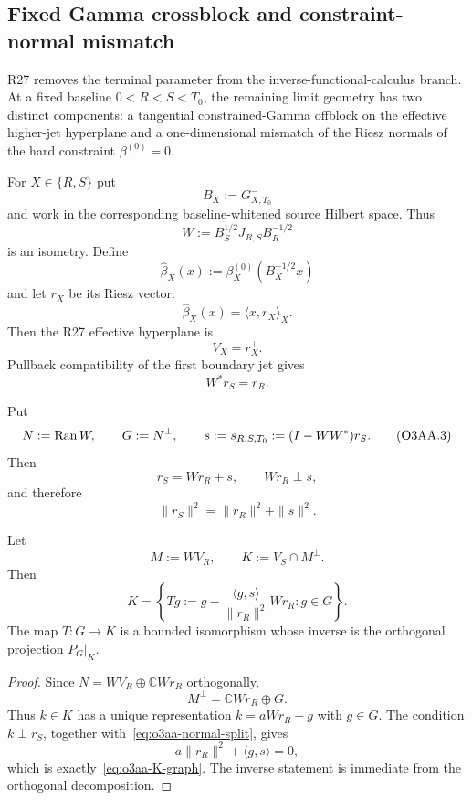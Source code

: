 
\subsection{Fixed Gamma crossblock and constraint-normal mismatch}
\label{subsec:o3aa-fixed-gamma-crossblock}

R27 removes the terminal parameter from the inverse-functional-calculus branch.  At a
fixed baseline $0<R<S<T_0$, the remaining limit geometry has two distinct components:
a tangential constrained-Gamma offblock on the effective higher-jet hyperplane and a
one-dimensional mismatch of the Riesz normals of the hard constraint
$\beta^{(0)}=0$.

For $X\in\{R,S\}$ put
\[
 B_X:=G_{X,T_0}^-
\]
and work in the corresponding baseline-whitened source Hilbert space.  Thus
\[
 W:=B_S^{1/2}J_{R,S}B_R^{-1/2}
\]
is an isometry.  Define
\[
 \widehat\beta_X(x):=\beta_X^{(0)}(B_X^{-1/2}x)
\]
and let $r_X$ be its Riesz vector:
\[
 \widehat\beta_X(x)=\langle x,r_X\rangle_X.
\]
Then the R27 effective hyperplane is
\[
 V_X=r_X^\perp.
\tag{O3AA.1}\label{eq:o3aa-VX}
\]
Pullback compatibility of the first boundary jet gives
\[
 \boxed{W^*r_S=r_R.}
\tag{O3AA.2}\label{eq:o3aa-normal-pullback}
\]

Put
\[
 N:=\operatorname{Ran} W,
 \qquad
 G:=N^\perp,
 \qquad
 s:=s_{R,S,T_0}:=(I-WW^*)r_S.
\tag{O3AA.3}\label{eq:o3aa-s}
\]
Then
\[
 \boxed{r_S=Wr_R+s,\qquad Wr_R\perp s,}
\tag{O3AA.4}\label{eq:o3aa-normal-split}
\]
and therefore
\[
 \|r_S\|^2=\|r_R\|^2+\|s\|^2.
\tag{O3AA.5}\label{eq:o3aa-normal-norm}
\]

\begin{proposition}
\label{prop:o3aa-graph-complement}
Let
\[
 M:=WV_R,
 \qquad
 K:=V_S\cap M^\perp.
\]
Then
\[
 \boxed{
 K=
 \left\{
 Tg:=g-
 \frac{\langle g,s\rangle}{\|r_R\|^2}Wr_R
 :g\in G
 \right\}.
 }
\tag{O3AA.6}\label{eq:o3aa-K-graph}
\]
The map $T:G\to K$ is a bounded isomorphism whose inverse is the orthogonal projection
$P_G|_K$.
\end{proposition}

\begin{proof}
Since $N=WV_R\oplus\mathbb C Wr_R$ orthogonally,
\[
 M^\perp=\mathbb C Wr_R\oplus G.
\]
Thus $k\in K$ has a unique representation $k=aWr_R+g$ with $g\in G$.  The condition
$k\perp r_S$, together with~\eqref{eq:o3aa-normal-split}, gives
\[
 a\|r_R\|^2+\langle g,s\rangle=0,
\]
which is exactly~\eqref{eq:o3aa-K-graph}.  The inverse statement is immediate from the
orthogonal decomposition.
\end{proof}


